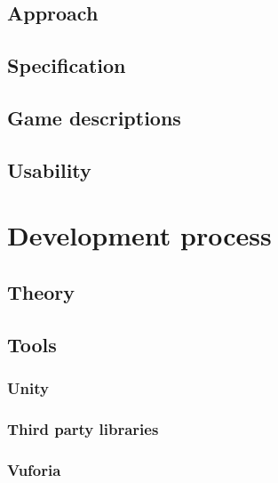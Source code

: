 \documentclass[BSP,english,oneside]{classes/gucthesis}
\begin{document}
	\chapter{Approach}
		\label{chap:approach}
		

	\chapter{Specification}
		\label{chap:specification}
		

	\chapter{Game descriptions}
		\label{chap:game_descriptions}
		

	\chapter{Usability}
		\label{chap:usability}
		


\part{Development process}

	\chapter{Theory}
		\label{chap:theory}
		

	\chapter{Tools}
		\label{chap:tools}

		\section{Unity}
			\label{chap:unity}
			

		\section{Third party libraries}
			\label{chap:third_party_libraries}
			

		\section{Vuforia}
			\label{chap:vuforia}
			
\end{document}
